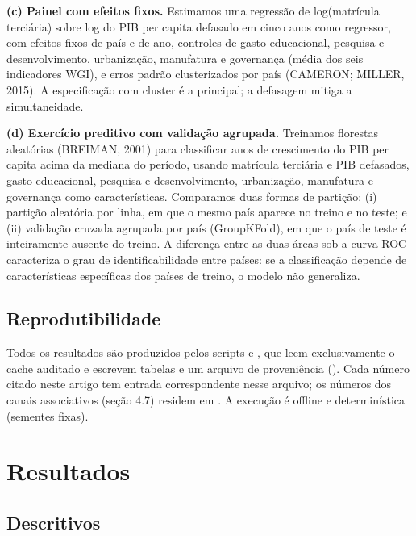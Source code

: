 \documentclass[12pt,a4paper]{article}
\begin{document}
\textbf{(c) Painel com efeitos fixos.} Estimamos uma regressão de log(matrícula terciária) sobre log do PIB per capita defasado em cinco anos como regressor, com efeitos fixos de país e de ano, controles de gasto educacional, pesquisa e desenvolvimento, urbanização, manufatura e governança (média dos seis indicadores WGI), e erros padrão clusterizados por país (CAMERON; MILLER, 2015). A especificação com cluster é a principal; a defasagem mitiga a simultaneidade.

\textbf{(d) Exercício preditivo com validação agrupada.} Treinamos florestas aleatórias (BREIMAN, 2001) para classificar anos de crescimento do PIB per capita acima da mediana do período, usando matrícula terciária e PIB defasados, gasto educacional, pesquisa e desenvolvimento, urbanização, manufatura e governança como características. Comparamos duas formas de partição: (i) partição aleatória por linha, em que o mesmo país aparece no treino e no teste; e (ii) validação cruzada agrupada por país (GroupKFold), em que o país de teste é inteiramente ausente do treino. A diferença entre as duas áreas sob a curva ROC caracteriza o grau de identificabilidade entre países: se a classificação depende de características específicas dos países de treino, o modelo não generaliza.

\subsection{Reprodutibilidade}

Todos os resultados são produzidos pelos scripts  e , que leem exclusivamente o cache auditado e escrevem tabelas e um arquivo de proveniência (). Cada número citado neste artigo tem entrada correspondente nesse arquivo; os números dos canais associativos (seção 4.7) residem em . A execução é offline e determinística (sementes fixas).

\section{Resultados}

\subsection{Descritivos}
\end{document}
